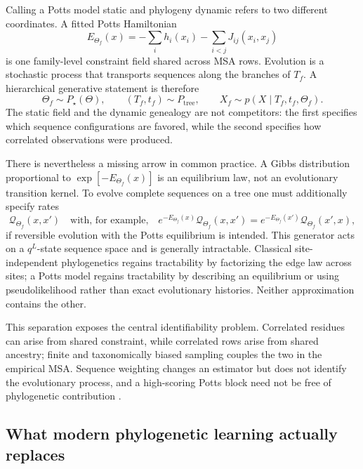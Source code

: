 \documentclass[10pt]{article}
\theoremstyle{definition}
\theoremstyle{remark}
\newcommand{\BookSection}[1]{\subsection{#1}}
\begin{document}
Calling a Potts model static and phylogeny dynamic refers to two different coordinates.  A fitted
Potts Hamiltonian
\begin{equation}
E_{\Theta_f}(x)
=-\sum_i h_i(x_i)-\sum_{i<j}J_{ij}(x_i,x_j)
\label{eq:phylo-potts-energy}
\end{equation}
is one family-level constraint field shared across MSA rows.  Evolution is a stochastic process
that transports sequences along the branches of $T_f$.  A hierarchical generative statement is
therefore
\begin{equation}
\Theta_f\sim P_\star(\Theta),
\qquad
(T_f,t_f)\sim P_{\mathrm{tree}},
\qquad
X_f\sim p(X\mid T_f,t_f,\Theta_f).
\label{eq:constraint-phylogeny-generative-model}
\end{equation}
The static field and the dynamic genealogy are not competitors: the first specifies which sequence
configurations are favored, while the second specifies how correlated observations were produced.

There is nevertheless a missing arrow in common practice.  A Gibbs distribution proportional to
$\exp[-E_{\Theta_f}(x)]$ is an equilibrium law, not an evolutionary transition kernel.  To evolve
complete sequences on a tree one must additionally specify rates
\begin{equation}
\mathcal Q_{\Theta_f}(x,x')
\quad\text{with, for example,}\quad
e^{-E_{\Theta_f}(x)}\mathcal Q_{\Theta_f}(x,x')
=e^{-E_{\Theta_f}(x')}\mathcal Q_{\Theta_f}(x',x),
\label{eq:potts-evolution-detailed-balance}
\end{equation}
if reversible evolution with the Potts equilibrium is intended.  This generator acts on a
$q^L$-state sequence space and is generally intractable.  Classical site-independent phylogenetics
regains tractability by factorizing the edge law across sites; a Potts model regains tractability by
describing an equilibrium or using pseudolikelihood rather than exact evolutionary histories.
Neither approximation contains the other.

This separation exposes the central identifiability problem.  Correlated residues can arise from
shared constraint, while correlated rows arise from shared ancestry; finite and taxonomically
biased sampling couples the two in the empirical MSA.  Sequence weighting changes an estimator but
does not identify the evolutionary process, and a high-scoring Potts block need not be free of
phylogenetic contribution \cite{obermayer2014,dietler2022}.

\BookSection{What modern phylogenetic learning actually replaces}
\end{document}
